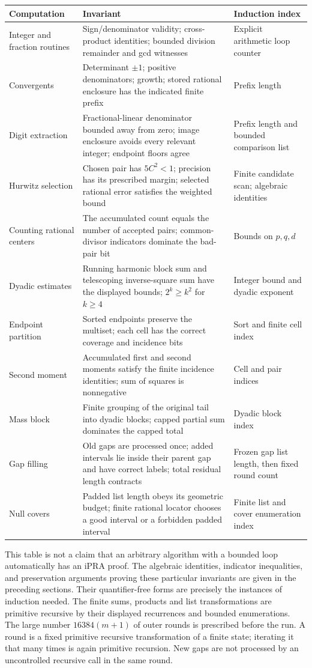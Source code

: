 \begin{longtable}{p{}p{}p{}}
\toprule
Computation & Invariant & Induction index\\
\midrule
\endhead
Integer and fraction routines & Sign/denominator validity; cross-product
identities; bounded division remainder and gcd witnesses & Explicit
arithmetic loop counter\\
Convergents & Determinant $\pm1$; positive denominators; growth; stored
rational enclosure has the indicated finite prefix & Prefix length\\
Digit extraction & Fractional-linear denominator bounded away from zero;
image enclosure avoids every relevant integer; endpoint floors agree &
Prefix length and bounded comparison list\\
Hurwitz selection & Chosen pair has $5C^2<1$; precision has its prescribed
margin; selected rational error satisfies the weighted bound & Finite
candidate scan; algebraic identities\\
Counting rational centers & The accumulated count equals the number of
accepted pairs; common-divisor indicators dominate the bad-pair bit &
Bounds on $p,q,d$\\
Dyadic estimates & Running harmonic block sum and telescoping
inverse-square sum have the displayed bounds; $2^k\ge k^2$ for $k\ge4$ &
Integer bound and dyadic exponent\\
Endpoint partition & Sorted endpoints preserve the multiset; each cell
has the correct coverage and incidence bits & Sort and finite cell index\\
Second moment & Accumulated first and second moments satisfy the finite
incidence identities; sum of squares is nonnegative & Cell and pair indices\\
Mass block & Finite grouping of the original tail into dyadic blocks;
capped partial sum dominates the capped total & Dyadic block index\\
Gap filling & Old gaps are processed once; added intervals lie inside
their parent gap and have correct labels; total residual length contracts &
Frozen gap list length, then fixed round count\\
Null covers & Padded list length obeys its geometric budget; finite
rational locator chooses a good interval or a forbidden padded interval &
Finite list and cover enumeration index\\
\bottomrule
\end{longtable}

This table is not a claim that an arbitrary algorithm with a bounded
loop automatically has an iPRA proof.  The algebraic identities,
indicator inequalities, and preservation arguments proving these
particular invariants are given in the preceding sections.  Their
quantifier-free forms are precisely the instances of induction needed.
The finite sums, products and list transformations are primitive
recursive by their displayed recurrences and bounded enumerations.
The large number $16384(m+1)$ of outer rounds is prescribed before the
run.  A round is a fixed primitive recursive transformation of a finite
state; iterating it that many times is again primitive recursion.
New gaps are not processed by an uncontrolled recursive call in the
same round.

